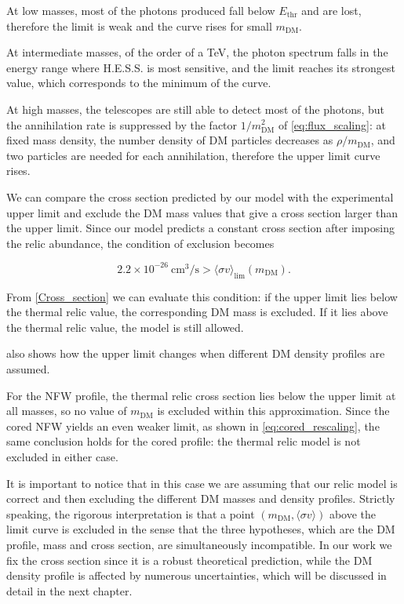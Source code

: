 At low masses, most of the photons produced fall below 
$E_{\mathrm{thr}}$ and are lost, therefore the limit is weak and the curve rises for small 
$m_{\mathrm{DM}}$.

At intermediate masses, of the order 
of a TeV, the photon spectrum falls in the energy range where H.E.S.S. is 
most sensitive, and the limit reaches its strongest value, which corresponds
to the minimum of the curve.

At high masses, the telescopes are still able to detect most of the photons, but the annihilation rate is suppressed by the factor 
$1/m_{\mathrm{DM}}^2$ of \cref{eq:flux_scaling}: at fixed mass density, the number density of DM 
particles decreases as $\rho/m_{\mathrm{DM}}$, and two particles are needed 
for each annihilation, therefore the upper limit curve rises.

We can compare the cross section predicted by our model with the experimental upper limit and exclude the DM mass values that give a cross section larger than the upper limit.
Since our model predicts a constant cross section after imposing the relic abundance, the condition of exclusion becomes

\begin{equation}
    2.2\times10^{-26}~\mathrm{cm^3/s}
    >
    \langle\sigma v\rangle_{\mathrm{lim}}(m_{\mathrm{DM}}) .
\end{equation}
 
From \cref{Cross_section} we can evaluate this condition: 
if the upper limit lies below the thermal relic value, the corresponding DM mass is excluded. 
If it lies above the thermal relic value, the model is still allowed.

 also shows how the upper limit changes when different DM density profiles are assumed. 

For the NFW profile, the thermal relic cross section lies below the upper 
limit at all masses, so no value of $m_{\mathrm{DM}}$ is excluded within 
this approximation. Since the cored NFW yields an even weaker limit, as 
shown in \cref{eq:cored_rescaling}, the same conclusion holds for the cored 
profile: the thermal relic model is not excluded in either case.


It is important to notice that in this case we are assuming that our relic model is correct and then excluding the different DM masses and density profiles.
Strictly speaking, the rigorous interpretation is that a point $(m_{\mathrm{DM}}, \langle\sigma v\rangle)$ above the limit curve is excluded in the sense that the three hypotheses, which are the DM profile, mass and cross section, are simultaneously incompatible.
In our work we fix the cross section since it is a robust theoretical prediction,
while the DM density profile is affected by numerous uncertainties, which will be discussed in detail in the next chapter.
